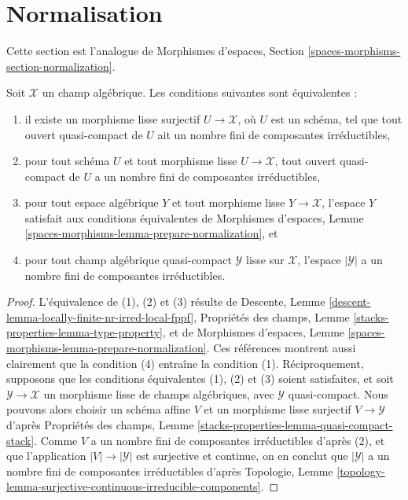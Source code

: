  
\section{Normalisation}
\label{section-normalization}

\noindent
Cette section est l'analogue de
Morphismes d'espaces, Section \ref{spaces-morphisms-section-normalization}.

\begin{lemma}
\label{lemma-prepare-normalization}
Soit $\mathcal{X}$ un champ algébrique. Les conditions suivantes sont équivalentes :
\begin{enumerate}
\item il existe un morphisme lisse surjectif $U \to \mathcal{X}$, où $U$
est un schéma, tel que tout ouvert quasi-compact de $U$ ait
un nombre fini de composantes irréductibles,
\item pour tout schéma $U$ et tout morphisme lisse
$U \to \mathcal{X}$, tout ouvert quasi-compact de $U$ a un nombre fini de
composantes irréductibles,
\item pour tout espace algébrique $Y$ et tout morphisme lisse $Y \to \mathcal{X}$,
l'espace $Y$ satisfait aux conditions équivalentes de
Morphismes d'espaces, Lemme \ref{spaces-morphisms-lemma-prepare-normalization},
et
\item pour tout champ algébrique quasi-compact $\mathcal{Y}$ lisse sur
$\mathcal{X}$, l'espace $|\mathcal{Y}|$ a un nombre fini de composantes
irréductibles.
\end{enumerate}
\end{lemma}

\begin{proof}
L'équivalence de (1), (2) et (3) résulte de
Descente, Lemme \ref{descent-lemma-locally-finite-nr-irred-local-fppf},
Propriétés des champs, Lemme \ref{stacks-properties-lemma-type-property}, et de
Morphismes d'espaces, Lemme \ref{spaces-morphisms-lemma-prepare-normalization}.
Ces références montrent aussi clairement que la condition (4)
entraîne la condition (1). Réciproquement, supposons que les conditions équivalentes
(1), (2) et (3) soient satisfaites, et soit $\mathcal{Y} \to \mathcal{X}$ un
morphisme lisse de champs algébriques, avec $\mathcal{Y}$
quasi-compact. Nous pouvons alors choisir un schéma affine $V$ et un morphisme lisse
surjectif $V \to \mathcal{Y}$ d'après Propriétés des champs, Lemme
\ref{stacks-properties-lemma-quasi-compact-stack}.
Comme $V$ a un nombre fini de composantes irréductibles d'après (2), et que
l'application $|V| \to |\mathcal{Y}|$ est surjective et continue, on en conclut que
$|\mathcal{Y}|$ a un nombre fini de composantes irréductibles d'après Topologie, Lemme
\ref{topology-lemma-surjective-continuous-irreducible-components}.
\end{proof}

